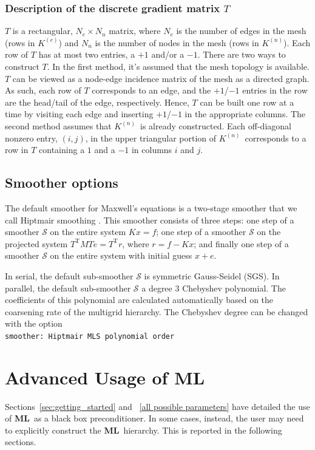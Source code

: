 \documentclass{article}[11pt]
\newcommand{\ML}     {{\bf ML}}
\newcommand \Ke {\ensuremath{K^{(e)}}}
\newcommand \Kn {\ensuremath{K^{(n)}}}
\begin{document}
\subsubsection{Description of the discrete gradient matrix $T$}\label{T matrix}
%
$T$ is a rectangular, $N_e\times N_n$ matrix, where $N_e$ is the number of
edges in the mesh (rows in \Ke) and $N_n$ is the number of nodes in the mesh
(rows in \Kn).
Each row of $T$ has at most two entries, a $+1$ and/or a $-1$.
There are two ways to construct $T$.
In the first method, 
it's assumed that the mesh topology is available.
$T$ can be viewed as a node-edge incidence matrix of the mesh as a
directed graph.
As such,
each row of $T$ corresponds to an edge, and the $+1$/$-1$ entries in the
row are the head/tail of the edge, respectively.
Hence, $T$ can be built one row at a time by visiting each edge and inserting
$+1$/$-1$ in the appropriate columns.
The second method assumes that \Kn\ is already constructed.
Each off-diagonal nonzero entry, $(i,j)$, in the upper triangular
portion of \Kn\ corresponds to a row in $T$ containing
a $1$ and a $-1$ in columns $i$ and $j$.
\subsection{Smoother options}\label{maxwell smoothers}
%
The default smoother for Maxwell's equations is a two-stage smoother that we
call Hiptmair smoothing \cite{Hiptmair_1998a}.
This smoother consists of three steps: one step of a smoother $\mathcal S$ on
the entire system $Kx=f$; one step of a smoother $\mathcal S$ on the
projected system $T^{\mathrm{T}}MTe=T^{\mathrm{T}}r$, where $r = f - Kx$;
and finally one step of a smoother $\mathcal S$ on the entire system with
initial guess $x+e$.

In serial, the default sub-smoother $\mathcal S$ is symmetric Gauss-Seidel
(SGS).
In parallel, the default sub-smoother $\mathcal S$ a degree 3 Chebyshev
polynomial.
The coefficients of this polynomial are calculated automatically based on the
coarsening rate of the multigrid hierarchy.
The Chebyshev degree can be changed with the option\\
\verb!smoother: Hiptmair MLS polynomial order!

\clearpage
\newpage

\section{Advanced Usage of \ML} \label{high level sample}
%
Sections~\ref{sec:getting_started} and ~\ref{all possible parameters} have detailed the
use of \ML~as a black box preconditioner. In some cases, instead, the
user may need to explicitly construct the \ML\ hierarchy. This is
reported in the following sections.
\end{document}
